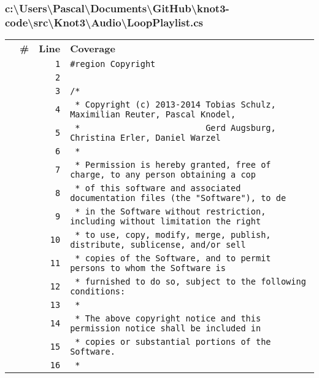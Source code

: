 \documentclass[a4paper,10pt]{article}
\begin{document}
\subsubsection{c:\textbackslash Users\textbackslash Pascal\textbackslash Documents\textbackslash GitHub\textbackslash knot3-code\textbackslash src\textbackslash Knot3\textbackslash Audio\textbackslash LoopPlaylist.cs}
\begin{longtable}[l]{lrrl}
\textbf{} & \textbf{\#} & \textbf{Line} & \textbf{Coverage}\\
\cellcolor{gray} &  & \verb~1~ & \verb~#region Copyright~\\
\cellcolor{gray} &  & \verb~2~ & \verb~~\\
\cellcolor{gray} &  & \verb~3~ & \verb~/*~\\
\cellcolor{gray} &  & \verb~4~ & \verb~ * Copyright (c) 2013-2014 Tobias Schulz, Maximilian Reuter, Pascal Knodel,~\\
\cellcolor{gray} &  & \verb~5~ & \verb~ *                         Gerd Augsburg, Christina Erler, Daniel Warzel~\\
\cellcolor{gray} &  & \verb~6~ & \verb~ *~\\
\cellcolor{gray} &  & \verb~7~ & \verb~ * Permission is hereby granted, free of charge, to any person obtaining a cop~\\
\cellcolor{gray} &  & \verb~8~ & \verb~ * of this software and associated documentation files (the "Software"), to de~\\
\cellcolor{gray} &  & \verb~9~ & \verb~ * in the Software without restriction, including without limitation the right~\\
\cellcolor{gray} &  & \verb~10~ & \verb~ * to use, copy, modify, merge, publish, distribute, sublicense, and/or sell~\\
\cellcolor{gray} &  & \verb~11~ & \verb~ * copies of the Software, and to permit persons to whom the Software is~\\
\cellcolor{gray} &  & \verb~12~ & \verb~ * furnished to do so, subject to the following conditions:~\\
\cellcolor{gray} &  & \verb~13~ & \verb~ *~\\
\cellcolor{gray} &  & \verb~14~ & \verb~ * The above copyright notice and this permission notice shall be included in ~\\
\cellcolor{gray} &  & \verb~15~ & \verb~ * copies or substantial portions of the Software.~\\
\cellcolor{gray} &  & \verb~16~ & \verb~ *~\\

\end{longtable}
\end{document}
